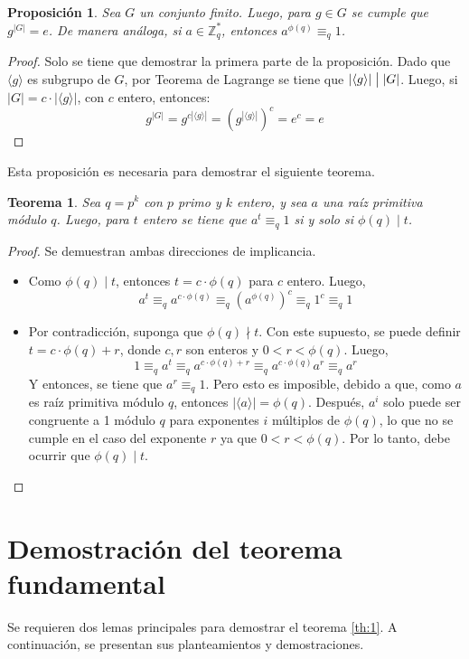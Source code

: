 \documentclass[hidelinks, 12pt]{article}
\newcommand{\Zs}{\mathbb{Z}^*}
\newcommand{\ra}{\rightarrow}
\newcommand{\la}{\leftarrow}
\newtheorem{theorem}{Teorema}
\newtheorem*{proposition}{Proposición}
\begin{document}
\begin{enumerate}
    \begin{proposition}
        Sea $G$ un conjunto finito. Luego, para $g\in G$ se cumple que $g^{|G|}=e$. De manera análoga, si $a\in\Zs_q$, entonces $a^{\phi(q)}\equiv_q 1$.
    \end{proposition}
    \begin{proof}
        Solo se tiene que demostrar la primera parte de la proposición. Dado que $\langle g\rangle$ es subgrupo de $G$, por Teorema de Lagrange se tiene que $|\langle g\rangle|\bigm||G|$. Luego, si $|G|=c\cdot|\langle g\rangle|$, con $c$ entero, entonces:
        \[g^{|G|}=g^{c|\langle g\rangle|}=(g^{|\langle g\rangle|})^c=e^c=e\]
    \end{proof}

    Esta proposición es necesaria para demostrar el siguiente teorema.
    \begin{theorem}
    \label{th:3}
        Sea $q=p^k$ con $p$ primo y $k$ entero, y sea $a$ una raíz primitiva módulo $q$. Luego, para $t$ entero se tiene que $a^t\equiv_q 1$ si y solo si $\phi(q)\mid t$.
    \end{theorem}
    \begin{proof}
        Se demuestran ambas direcciones de implicancia.
        \begin{itemize}
            \item[$\la)$] Como $\phi(q)\mid t$, entonces $t=c\cdot\phi(q)$ para $c$ entero. Luego,
            \[a^t\equiv_q a^{c\cdot\phi(q)}\equiv_q(a^{\phi(q)})^c\equiv_q 1^c\equiv_q 1\]
            \item[$\ra)$] Por contradicción, suponga que $\phi(q)\nmid t$. Con este supuesto, se puede definir $t=c\cdot\phi(q)+r$, donde $c,r$ son enteros y $0<r<\phi(q)$. Luego,
            \[1\equiv_q a^t\equiv_q a^{c\cdot\phi(q)+r}\equiv_q a^{c\cdot\phi(q)}a^r\equiv_q a^r\]
            Y entonces, se tiene que $a^r\equiv_q 1$. Pero esto es imposible, debido a que, como $a$ es raíz primitiva módulo $q$, entonces $|\langle a\rangle|=\phi(q)$. Después, $a^i$ solo puede ser congruente a 1 módulo $q$ para exponentes $i$ múltiplos de $\phi(q)$, lo que no se cumple en el caso del exponente $r$ ya que $0<r<\phi(q)$. Por lo tanto, debe ocurrir que $\phi(q)\mid t$.
        \end{itemize}
    \end{proof}
\end{enumerate}


\newpage
\section{Demostración del teorema fundamental}
Se requieren dos lemas principales para demostrar el teorema \ref{th:1}. A continuación, se presentan sus planteamientos y demostraciones.
\end{document}
